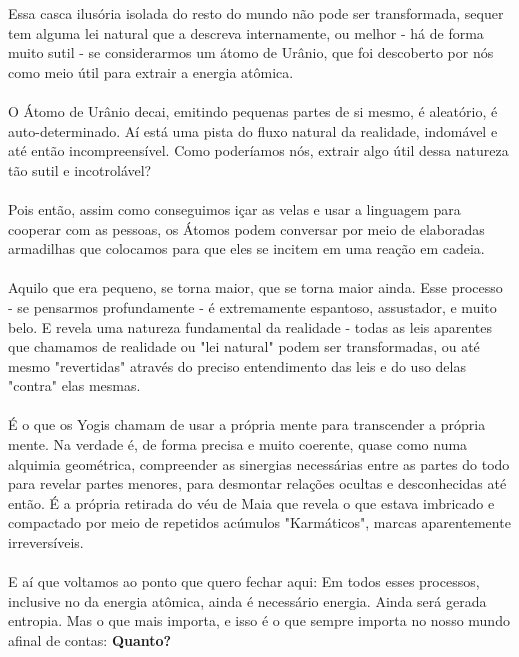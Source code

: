 \documentclass[11pt]{article}
\begin{document}
Essa casca ilusória isolada do resto do mundo não pode ser transformada, sequer tem alguma lei natural que a descreva internamente, ou melhor - há de forma muito sutil - se considerarmos um átomo de Urânio, que foi descoberto por nós como meio útil para extrair a energia atômica.\\\\

O Átomo de Urânio decai, emitindo pequenas partes de si mesmo, é aleatório, é auto-determinado. Aí está uma pista do fluxo natural da realidade, indomável e até então incompreensível. Como poderíamos nós, extrair algo útil dessa natureza tão sutil e incotrolável?\\\\

Pois então, assim como conseguimos içar as velas e usar a linguagem para cooperar com as pessoas, os Átomos podem conversar por meio de elaboradas armadilhas que colocamos para que eles se incitem em uma reação em cadeia.\\\\

Aquilo que era pequeno, se torna maior, que se torna maior ainda. Esse processo - se pensarmos profundamente - é extremamente espantoso, assustador, e muito belo. E revela uma natureza fundamental da realidade - todas as leis aparentes que chamamos de realidade ou "lei natural" podem ser transformadas, ou até mesmo "revertidas" através do preciso entendimento das leis e do uso delas "contra" elas mesmas.\\\\

É o que os Yogis chamam de usar a própria mente para transcender a própria mente. Na verdade é, de forma precisa e muito coerente, quase como numa alquimia geométrica, compreender as sinergias necessárias entre as partes do todo para revelar partes menores, para desmontar relações ocultas e desconhecidas até então. É a própria retirada do véu de Maia que revela o que estava imbricado e compactado por meio de repetidos acúmulos "Karmáticos", marcas aparentemente irreversíveis. \\\\

E aí que voltamos ao ponto que quero fechar aqui: Em todos esses processos, inclusive no da energia atômica, ainda é necessário energia. Ainda será gerada entropia. Mas o que mais importa, e isso é o que sempre importa no nosso mundo afinal de contas: \textbf{Quanto?}\\\
\end{document}
